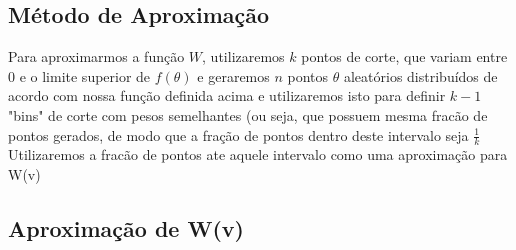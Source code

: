 \documentclass[twocolumn,amsmath,amssymb,floatfix]{revtex4}
\begin{document}
\subsection{Método de Aproximação}
\indent Para aproximarmos a função $W$, utilizaremos $k$ pontos de corte, que variam entre 0 e o limite superior de $f(\theta)$ e geraremos $n$ pontos $\theta$ aleatórios distribuídos de acordo com nossa função definida acima e utilizaremos isto para definir $k-1$ "bins" de corte com pesos semelhantes (ou seja, que possuem mesma fracão de pontos gerados, de modo que a fração de pontos dentro deste intervalo seja $\frac{1}{k}$ \\
Utilizaremos a fracão de pontos ate aquele intervalo como uma aproximação para W(v)
\subsection{Aproximação de W(v)}
\end{document}
